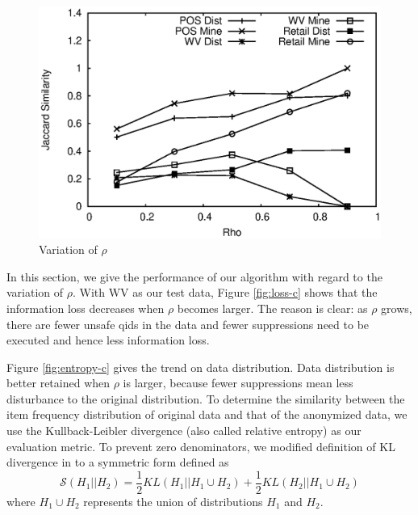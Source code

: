 \begin{figure}[th]
{\begin{minipage}[c]{0.48\textwidth}
\centering
\includegraphics[width=\textwidth]{J.eps}
\end{minipage}%
}
\caption{Variation of $\rho$}\label{fig:rho}
\end{figure}

In this section, we give the performance of our
algorithm with regard to the variation of $\rho$.
With WV as our test data, Figure \ref{fig:loss-c} shows that
the information loss decreases when $\rho$ becomes larger.
The reason is clear: as $\rho$ grows,
there are fewer unsafe qids in the data and
fewer suppressions need to be executed and 
hence less information loss. 

Figure \ref{fig:entropy-c} gives the trend on data distribution. 
Data distribution is better retained when $\rho$ is larger, 
because fewer suppressions mean less disturbance to the original distribution.
To determine the similarity between the item frequency distribution
of original data and that of the anonymized data,
we use the Kullback-Leibler divergence (also called relative entropy) as our evaluation metric.
To prevent zero denominators, we modified  definition of KL divergence 
in  
to a symmetric form \cite{Fisher:2008:DSF} defined as
\[\mathcal{S}(H_1||H_2)=\frac{1}{2}KL( H_1||H_1 \cup H_2)+\frac{1}{2} KL( H_2||H_1 \cup H_2)\]
where  $H_1 \cup H_2$ represents the union of distributions $H_1$ and $H_2$.

